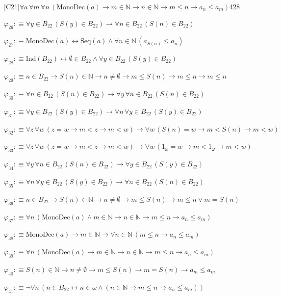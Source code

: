 \begin{fullproof}{[C21]}{$\forall a\,\forall m\,\forall n\,(\mathrm{MonoDec}(a) \to m \in \mathbb{N} \to n \in \mathbb{N} \to m \leq n \to a_{n} \leq a_{m})$}{428}
\begin{abbrevlist}
\item $\varphi_{26} :\equiv \forall y \in B_{22}\,(S(y) \in B_{22}) \to \forall n \in B_{22}\,(S(n) \in B_{22})$
\item $\varphi_{27} :\equiv \mathrm{MonoDec}(a) \leftrightarrow \mathrm{Seq}(a) \land \forall n \in \mathbb{N}\,(a_{S(n)} \leq a_{n})$
\item $\varphi_{28} :\equiv \mathrm{Ind}(B_{22}) \leftrightarrow \emptyset \in B_{22} \land \forall y \in B_{22}\,(S(y) \in B_{22})$
\item $\varphi_{29} :\equiv n \in B_{22} \to S(n) \in \mathbb{N} \to n \neq \emptyset \to m \leq S(n) \to m \leq n \to m \leq n$
\item $\varphi_{30} :\equiv \forall n \in B_{22}\,(S(n) \in B_{22}) \to \forall y\,\forall n \in B_{22}\,(S(n) \in B_{22})$
\item $\varphi_{31} :\equiv \forall y \in B_{22}\,(S(y) \in B_{22}) \to \forall n\,\forall y \in B_{22}\,(S(y) \in B_{22})$
\item $\varphi_{32} :\equiv \forall z\,\forall w\,(z = w \to m < z \to m < w) \to \forall w\,(S(n) = w \to m < S(n) \to m < w)$
\item $\varphi_{33} :\equiv \forall z\,\forall w\,(z = w \to m < z \to m < w) \to \forall w\,(1_{\omega} = w \to m < 1_{\omega} \to m < w)$
\item $\varphi_{34} :\equiv \forall y\,\forall n \in B_{22}\,(S(n) \in B_{22}) \to \forall y \in B_{22}\,(S(y) \in B_{22})$
\item $\varphi_{35} :\equiv \forall n\,\forall y \in B_{22}\,(S(y) \in B_{22}) \to \forall n \in B_{22}\,(S(n) \in B_{22})$
\item $\varphi_{36} :\equiv n \in B_{22} \to S(n) \in \mathbb{N} \to n \neq \emptyset \to m \leq S(n) \to m \leq n \lor m = S(n)$
\item $\varphi_{37} :\equiv \forall n\,(\mathrm{MonoDec}(a) \land m \in \mathbb{N} \to n \in \mathbb{N} \to m \leq n \to a_{n} \leq a_{m})$
\item $\varphi_{38} :\equiv \mathrm{MonoDec}(a) \to m \in \mathbb{N} \to \forall n \in \mathbb{N}\,(m \leq n \to a_{n} \leq a_{m})$
\item $\varphi_{39} :\equiv \forall n\,(\mathrm{MonoDec}(a) \to m \in \mathbb{N} \to n \in \mathbb{N} \to m \leq n \to a_{n} \leq a_{m})$
\item $\varphi_{40} :\equiv S(n) \in \mathbb{N} \to n \neq \emptyset \to m \leq S(n) \to m = S(n) \to a_{m} \leq a_{m}$
\item $\varphi_{41} :\equiv \neg \forall n\,(n \in B_{22} \leftrightarrow n \in \omega \land (n \in \mathbb{N} \to m \leq n \to a_{n} \leq a_{m}))$

\end{abbrevlist}
\end{fullproof}
